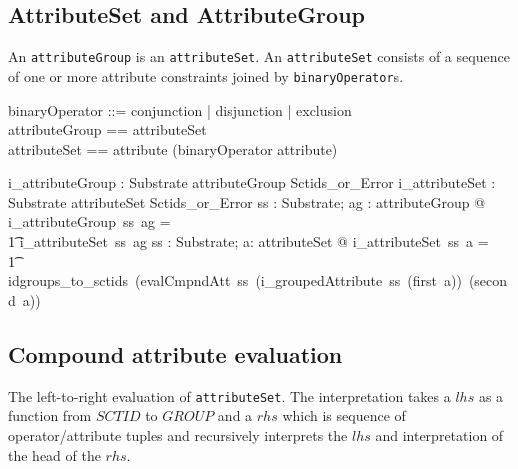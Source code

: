 \documentclass{article}
\def\spec#1{{\tt #1}}
\begin{document}
\subsection{AttributeSet and AttributeGroup}
An \spec{attributeGroup} is an \spec{attributeSet}.  An \spec{attributeSet} consists of a sequence of one or more attribute constraints joined by \spec{binaryOperator}s.


\begin{zed}
binaryOperator  ::= conjunction | disjunction | exclusion \\
attributeGroup == attributeSet \\
attributeSet == attribute \cross \seq (binaryOperator \cross attribute) 
\end{zed}

\begin{gendef}
   i\_attributeGroup : Substrate \pfun attributeGroup \pfun Sctids\_or\_Error 
\also
   i\_attributeSet : Substrate \pfun attributeSet \pfun Sctids\_or\_Error 
\where
\forall ss : Substrate; ag : attributeGroup @ i\_attributeGroup~ss~ag = \\
\t1 i\_attributeSet~ss~ag
\also
\forall ss : Substrate; a: attributeSet @ i\_attributeSet~ss~a = \\
\t1 idgroups\_to\_sctids~(evalCmpndAtt~ss~(i\_groupedAttribute~ss~(first~a))~(second~a))
\end{gendef}

\subsection{Compound attribute evaluation}
The left-to-right evaluation of \spec{attributeSet}.  The interpretation takes a $lhs$ as 
a function from $SCTID$ to $GROUP$ and a $rhs$ which is sequence of operator/attribute
tuples and recursively interprets the $lhs$ and interpretation of the head of the $rhs$.
\end{document}
